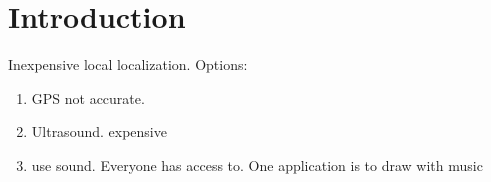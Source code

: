 \section{Introduction}
 Inexpensive local localization. Options:
\begin{enumerate}
\item GPS not accurate.
\item Ultrasound. expensive
\item use sound. Everyone has access to. One application is to draw with music
\end{enumerate} 
